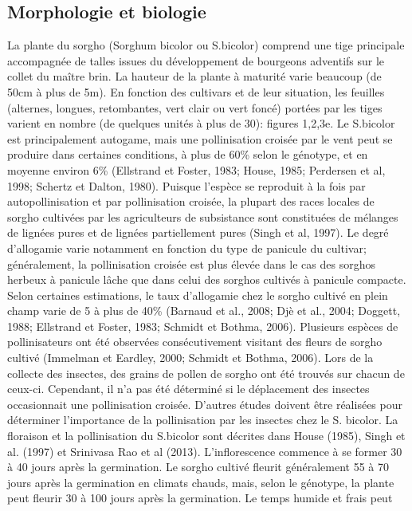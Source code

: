 \documentclass[a4paper,11pt]{article}
\begin{document}
 
\subsection{Morphologie et biologie} La plante du sorgho
(Sorghum bicolor ou S.bicolor) comprend une tige principale
accompagnée de talles issues du développement de bourgeons
adventifs sur le collet du maître brin. La hauteur de la plante à
maturité varie beaucoup (de 50cm à plus de 5m). En fonction des
cultivars et de leur situation, les feuilles (alternes, longues,
retombantes, vert clair ou vert foncé) portées par les tiges
varient en nombre (de quelques unités à plus de 30): figures
1,2,3e\cite{BARRO_KONDOMBO_2010}. Le S.bicolor est principalement autogame, mais une
pollinisation croisée par le vent peut se produire dans certaines
conditions, à plus de 60\% selon le génotype, et en moyenne
environ 6\% (Ellstrand et Foster, 1983; House, 1985; Perdersen et
al, 1998; Schertz et Dalton, 1980). Puisque l’espèce se reproduit
à la fois par autopollinisation et par pollinisation croisée, la
plupart des races locales de sorgho cultivées par les
agriculteurs de subsistance sont constituées de mélanges de
lignées pures et de lignées partiellement pures (Singh et al,
1997). Le degré d’allogamie varie notamment en fonction du type
de panicule du cultivar; généralement, la pollinisation croisée
est plus élevée dans le cas des sorghos herbeux à panicule lâche
que dans celui des sorghos cultivés à panicule compacte. Selon
certaines estimations, le taux d’allogamie chez le sorgho cultivé
en plein champ varie de 5 à plus de 40\% (Barnaud et al., 2008;
Djè et al., 2004; Doggett, 1988; Ellstrand et Foster, 1983;
Schmidt et Bothma, 2006). Plusieurs espèces de pollinisateurs ont
été observées consécutivement visitant des fleurs de sorgho
cultivé (Immelman et Eardley, 2000; Schmidt et Bothma,
2006). Lors de la collecte des insectes, des grains de pollen de
sorgho ont été trouvés sur chacun de ceux-ci. Cependant, il n’a
pas été déterminé si le déplacement des insectes occasionnait une
pollinisation croisée. D’autres études doivent être réalisées
pour déterminer l’importance de la pollinisation par les insectes
chez le S. bicolor. La floraison et la pollinisation du S.bicolor
sont décrites dans House (1985), Singh et al. (1997) et Srinivasa
Rao et al (2013). L’inflorescence commence à se former 30 à 40
jours après la germination. Le sorgho cultivé fleurit
généralement 55 à 70 jours après la germination en climats
chauds, mais, selon le génotype, la plante peut fleurir 30 à 100
jours après la germination. Le temps humide et frais peut
\end{document}
